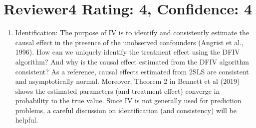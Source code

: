 \documentclass{article}
\begin{document}
\section{Reviewer4 Rating: 4, Confidence: 4}
\begin{enumerate}
    \item Identification: The purpose of IV is to identify and consistently estimate the causal effect in the presence of the unobserved confounders (Angrist et al., 1996). How can we uniquely identify the treatment effect using the DFIV algorithm? And why is the causal effect estimated from the DFIV algorithm consistent? As a reference, causal effects estimated from 2SLS are consistent and asymptotically normal. Moreover, Theorem 2 in Bennett et al (2019) shows the estimated parameters (and treatment effect) converge in probability to the true value. Since IV is not generally used for prediction problems, a careful discussion on identification (and consistency) will be helpful.
    

\end{enumerate}
\end{document}
